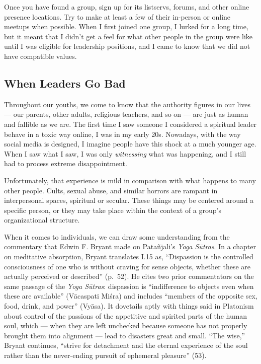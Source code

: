 \documentclass[
]{book}
\begin{document}
Once you have found a group, sign up for its listservs, forums, and other online presence locations. Try to make at least a few of their in-person or online meetups when possible. When I first joined one group, I lurked for a long time, but it meant that I didn't get a feel for what other people in the group were like until I was eligible for leadership positions, and I came to know that we did not have compatible values.

\hypertarget{when-leaders-go-bad}{%
\subsection{When Leaders Go Bad}\label{when-leaders-go-bad}}

Throughout our youths, we come to know that the authority figures in our lives --- our parents, other adults, religious teachers, and so on --- are just as human and fallible as we are. The first time I saw someone I considered a spiritual leader behave in a toxic way online, I was in my early 20s. Nowadays, with the way social media is designed, I imagine people have this shock at a much younger age. When I saw what I saw, I was only \emph{witnessing} what was happening, and I still had to process extreme disappointment.

Unfortunately, that experience is mild in comparison with what happens to many other people. Cults, sexual abuse, and similar horrors are rampant in interpersonal spaces, spiritual or secular. These things may be centered around a specific person, or they may take place within the context of a group's organizational structure.

When it comes to individuals, we can draw some understanding from the commentary that Edwin F. Bryant made on Patañjali's \emph{Yoga Sūtras}. In a chapter on meditative absorption, Bryant translates I.15 as, ``Dispassion is the controlled consciousness of one who is without craving for sense objects, whether these are actually perceived or described'' (p.~52). He cites two prior commentators on the same passage of the \emph{Yoga Sūtras}: dispassion is ``indifference to objects even when these are available'' (Vācaspati Miśra) and includes ``members of the opposite sex, food, drink, and power'' (Vyāsa). It dovetails aptly with things said in Platonism about control of the passions of the appetitive and spirited parts of the human soul, which --- when they are left unchecked because someone has not properly brought them into alignment --- lead to disasters great and small. ``The wise,'' Bryant continues, ``strive for detachment and the eternal experience of the soul rather than the never-ending pursuit of ephemeral pleasure'' (53).
\end{document}
